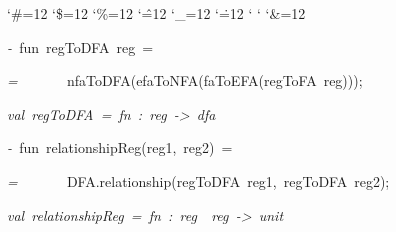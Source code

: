 \begin{list}{}
{\setlength{\leftmargin}{\leftmargini}
\setlength{\rightmargin}{0cm}
\setlength{\itemindent}{0cm}
\setlength{\listparindent}{0cm}
\setlength{\itemsep}{0cm}
\setlength{\parsep}{0cm}
\setlength{\labelsep}{0cm}
\setlength{\labelwidth}{0cm}
\catcode`\#=12
\catcode`\$=12
\catcode`\%=12
\catcode`\^=12
\catcode`\_=12
\catcode`\.=12
\catcode`
\catcode`
\catcode`\&=12
\ttfamily}
\small
\item[]\textsl{-\ }fun\ regToDFA\ reg\ =
\item[]\textsl{=\ }\ \ \ \ \ \ nfaToDFA(efaToNFA(faToEFA(regToFA\ reg)));
\item[]\textsl{val\ regToDFA\ =\ fn\ :\ reg\ ->\ dfa}
\item[]\textsl{-\ }fun\ relationshipReg(reg1,\ reg2)\ =
\item[]\textsl{=\ }\ \ \ \ \ \ DFA.relationship(regToDFA\ reg1,\ regToDFA\ reg2);
\item[]\textsl{val\ relationshipReg\ =\ fn\ :\ reg\ \ reg\ ->\ unit}
\end{list}
